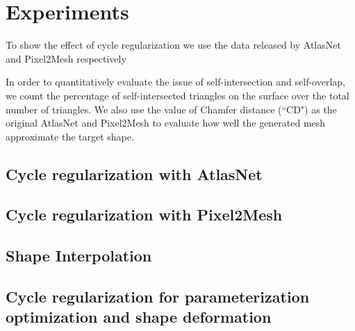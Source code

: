\section{Experiments}

 To show the effect of cycle regularization we use the data released by AtlasNet and Pixel2Mesh respectively \cite{3DR2N2}

In order to quantitatively evaluate the issue of self-intersection and self-overlap, we count the percentage of self-intersected triangles on the surface over the total number of triangles. We also use the value of Chamfer distance (``CD") as the original AtlasNet and Pixel2Mesh to evaluate how well the generated mesh approximate the target shape.
\subsection{Cycle regularization with AtlasNet}


\subsection{Cycle regularization with Pixel2Mesh}


\subsection{Shape Interpolation}


\subsection{Cycle regularization for parameterization optimization and shape deformation}
